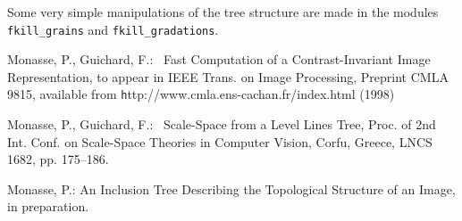 Some very simple manipulations of the tree structure are made in the modules
\texttt{fkill\_grains} and \texttt{fkill\_gradations}.

\begin{thebibliography}{10}
 Monasse, P., Guichard, F.:~
Fast Computation of a Contrast-Invariant Image Representation,
to appear in IEEE Trans. on Image Processing,
Preprint CMLA 9815, available from {\texttt
http://www.cmla.ens-cachan.fr/index.html} (1998)

 Monasse, P., Guichard, F.:~
Scale-Space from a Level Lines Tree,
Proc. of 2nd Int. Conf. on Scale-Space Theories in Computer
Vision, Corfu, Greece, LNCS 1682, pp. 175--186.

Monasse, P.:
An Inclusion Tree Describing the Topological Structure of an Image,
in preparation.
\end{thebibliography}
